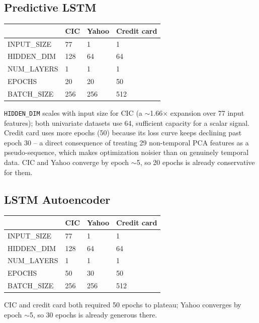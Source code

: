 \subsection{Predictive LSTM}

\begin{center}
\begin{tabular}{@{}llll@{}}
\toprule
 & CIC & Yahoo & Credit card \\
\midrule
INPUT\_SIZE & 77 & 1 & 1 \\
HIDDEN\_DIM & 128 & 64 & 64 \\
NUM\_LAYERS & 1 & 1 & 1 \\
EPOCHS & 20 & 20 & 50 \\
BATCH\_SIZE & 256 & 256 & 512 \\
\bottomrule
\end{tabular}
\end{center}

\texttt{HIDDEN\_DIM} scales with input size for CIC (a $\sim$1.66$\times$ expansion over 77 input features); both univariate datasets use 64, sufficient capacity for a scalar signal. Credit card uses more epochs (50) because its loss curve keeps declining past epoch 30 -- a direct consequence of treating 29 non-temporal PCA features as a pseudo-sequence, which makes optimization noisier than on genuinely temporal data. CIC and Yahoo converge by epoch $\sim$5, so 20 epochs is already conservative for them.

\subsection{LSTM Autoencoder}

\begin{center}
\begin{tabular}{llll}
\toprule
 & CIC & Yahoo & Credit card \\
\midrule
INPUT\_SIZE & 77 & 1 & 1 \\
HIDDEN\_DIM & 128 & 64 & 64 \\
NUM\_LAYERS & 1 & 1 & 1 \\
EPOCHS & 50 & 30 & 50 \\
BATCH\_SIZE & 256 & 256 & 512 \\
\bottomrule
\end{tabular}
\end{center}

CIC and credit card both required 50 epochs to plateau; Yahoo converges by epoch $\sim$5, so 30 epochs is already generous there.

